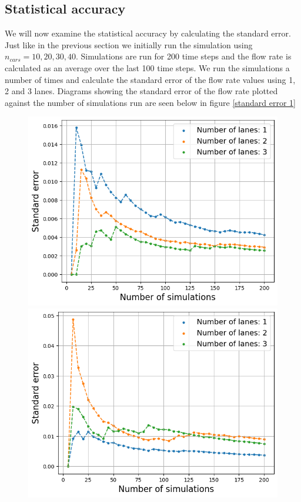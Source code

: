 \documentclass[a4paper,12pt]{article}
\begin{document}
\subsection*{Statistical accuracy}
We will now examine the statistical accuracy by calculating the standard error. Just like in the previous section we initially run the simulation
using $n_{cars}=10, 20, 30, 40$. Simulations are run for 200 time steps and the flow rate is calculated as an average over the last 100 time steps.
We run the simulations a number of times and calculate the standard error of the flow rate values using 1, 2 and 3 lanes. Diagrams showing the
standard error of the flow rate plotted against the number of simulations run are seen below in figure \ref*{standard error 1}

\begin{figure}[H]
    \centering
    \begin{minipage}{.5\textwidth}
        \centering
        \includegraphics[scale=0.47]{Images/standard error 10 cars 120.png}
    \end{minipage}%
    \begin{minipage}{.5\textwidth}
        \centering
        \includegraphics[scale=0.47]{Images/standard error 30 cars 120.png}

\end{minipage}
\end{figure}
\end{document}
